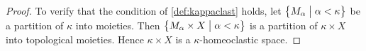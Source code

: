 \documentclass[11pt]{amsart}
\makeatletter
\newtheorem{theorem}{Theorem}[section]
\theoremstyle{definition}
\newtheorem{definition}[theorem]{Definition}
\newcommand{\F}{\mathcal F}
\newcommand{\makeset}[2]{\left\lbrace #1 \;\middle|\;
 \begin{tabular}{@{}l@{}}
   #2
  \end{tabular}
  \right\rbrace}
\makeatother
\begin{document}
\begin{proof}
   
    To verify that the condition of \cref{def:kappaclast} holds, let \(\makeset{M_\alpha}{$\alpha< \kappa$}\) be a partition of \(\kappa\) into moieties. Then \(\makeset{M_\alpha \times X}{$\alpha< \kappa$}\) is a partition of \(\kappa\times X\) into topological moieties. Hence \(\kappa \times X\) is a \(\kappa\)-homeoclastic space.
\end{proof}












    
\end{document}
